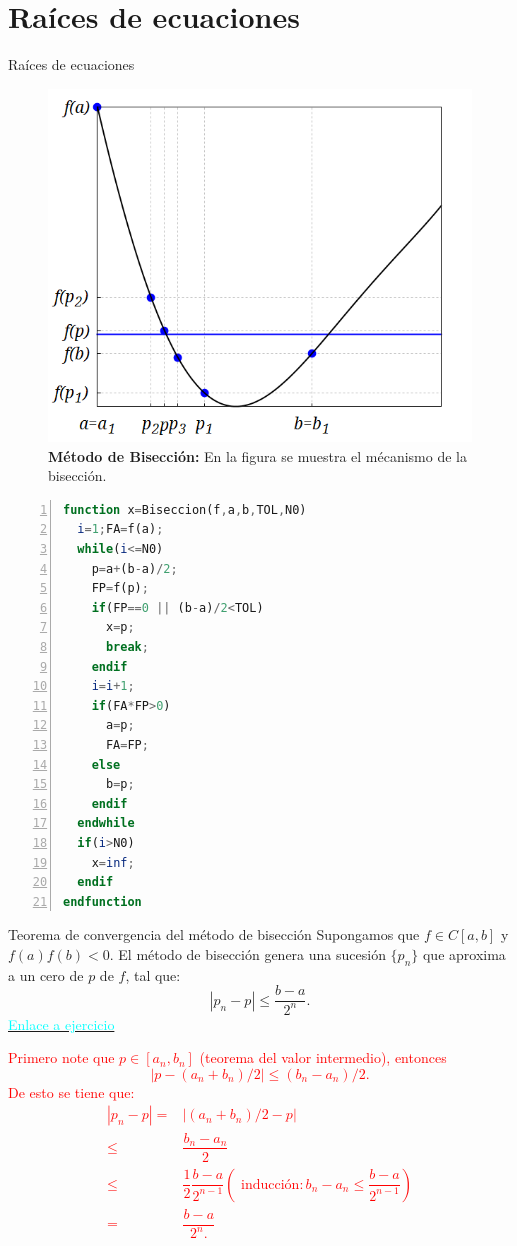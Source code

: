 \section{Raíces de ecuaciones}
\begin{frame}{Raíces de ecuaciones}
\begin{figure}[H]
\begin{center}
\includegraphics[scale=0.7]{Imagen20}
\end{center}
\caption{\textbf{Método de Bisección: }En la figura se muestra el mécanismo de la bisección.}
\end{figure}
\begin{lstlisting}[caption=''Método de Bisección'',style=mystyle,language=octave,numbers=left]
function x=Biseccion(f,a,b,TOL,N0)
  i=1;FA=f(a);
  while(i<=N0)
    p=a+(b-a)/2;
    FP=f(p);
    if(FP==0 || (b-a)/2<TOL)
      x=p;
      break;
    endif
    i=i+1;
    if(FA*FP>0) 
      a=p;
      FA=FP;
    else
      b=p;  
    endif
  endwhile
  if(i>N0)
    x=inf;
  endif
endfunction
\end{lstlisting}
\begin{block}{Teorema de convergencia del método de bisección}
Supongamos que $f\in C[a,b]$ y $f(a)f(b)<0$. El método de bisección genera una sucesión $\{p_n\}$ que aproxima a un cero de $p$ de $f$, tal que:
$$|p_n-p|\leq \dfrac{b-a}{2^n}.$$
\hyperlink{EjercicioBiseccion}{\textcolor{cyan}{Enlace a ejercicio}}
\end{block}
\textcolor{red}{
\indent Primero note que $p\in [a_n,b_n]$ (teorema del valor intermedio), entonces $$|p-(a_n+b_n)/2|\leq(b_n-a_n)/2.$$ De esto se tiene que:
\begin{align*}
|p_n-p|=&|(a_n+b_n)/2-p|\\
\leq & \dfrac{b_n-a_n}{2}\\
\leq & \dfrac{1}{2}\dfrac{b-a}{2^{n-1}} (\text{ inducción}: b_n-a_n\leq \dfrac{b-a}{2^{n-1}})\\
=& \dfrac{b-a}{2^n.}
\end{align*}
}
\end{frame}